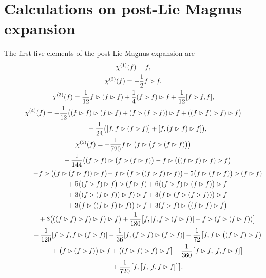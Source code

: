 \documentclass[pdftex]{sigma}
\numberwithin{equation}{section}
\begin{document}
\appendix

\section{Calculations on post-Lie Magnus expansion}\label{C.pl-Magnus}

The first five elements of the post-Lie Magnus expansion are
\begin{gather*}
\chi^{(1)}(f) = f,
\\
\chi^{(2)}(f) = -\frac{1}{2}f \rhd f,
\\
\chi^{(3)}(f) = \frac{1}{12}f \rhd (f \rhd f) + \frac{1}{4}(f \rhd f) \rhd f + \frac{1}{12}[f \rhd f, f],
\\
\chi^{(4)}(f) = -\frac{1}{12}\big( (f \rhd f) \rhd (f \rhd f)
+ (f \rhd (f \rhd f)) \rhd f+ ((f \rhd f) \rhd f) \rhd f \big)
\\ \hphantom{\chi^{(4)}(f) =}
{} + \frac{1}{24}\big([f, f \rhd (f \rhd f)] + [f, (f \rhd f) \rhd f]\big),
\\
\chi^{(5)}(f) = -\frac{1}{720}f \rhd \big( f \rhd \big(f \rhd (f \rhd f)\big)\big)
\\ \hphantom{\chi^{(5)}(f) = }
{}+ \frac{1}{144}\big((f \rhd f) \rhd \big(f \rhd (f \rhd f)\big) - f \rhd \big(((f \rhd f) \rhd f) \rhd f\big)
\\ \hphantom{\chi^{(5)}(f) = }
{}-\! f \rhd \big((f \rhd (f \rhd f)) \rhd f\big) \!- f \rhd \big(f \rhd ((f \rhd f) \rhd f)\big) \!+ 5\big(f \rhd (f \rhd f)\big) \rhd (f \rhd f)
\\ \hphantom{\chi^{(5)}(f) = }
{} +5\big((f \rhd f) \rhd f\big) \rhd (f \rhd f) + 6\big((f \rhd f) \rhd (f \rhd f)\big) \rhd f
\\ \hphantom{\chi^{(5)}(f) = }
{} + 3\big((f \rhd (f \rhd f)\big) \rhd f ) \rhd f+
 3\big(f \rhd (f \rhd (f \rhd f))\big) \rhd f
\\ \hphantom{\chi^{(5)}(f) = }
{}+ 3\big(f \rhd ((f \rhd f) \rhd f)\big) \rhd f + 3(f \rhd f) \rhd \big((f \rhd f) \rhd f\big)
\\ \hphantom{\chi^{(5)}(f) = }
{}+ 3\big(((f \rhd f) \rhd f) \rhd f\big) \rhd f \big) + \frac{1}{180}\big[f, [f, f \rhd (f \rhd f)] - f \rhd (f \rhd (f \rhd f))\big]
\\ \hphantom{\chi^{(5)}(f) = }
{}- \frac{1}{120} [ f \rhd f, f \rhd (f \rhd f)]- \frac{1}{36}[f, (f \rhd f) \rhd (f \rhd f)]- \frac{1}{72}\big[f, f \rhd \big((f \rhd f) \rhd f\big)
\\ \hphantom{\chi^{(5)}(f) = }
{}+ \big(f \rhd (f \rhd f)\big) \rhd f + \big((f \rhd f) \rhd f\big) \rhd f\big]-\frac{1}{360}\big[ f \rhd f, [f, f \rhd f]\big]
\\ \hphantom{\chi^{(5)}(f) = }
{} + \frac{1}{720}\big[f, \big[f, [f, f \rhd f]\big]\big].
\end{gather*}
\end{document}
